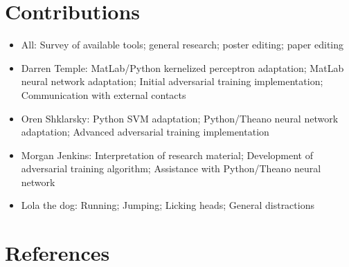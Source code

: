 \documentclass{article} %
\begin{document}

\section*{Contributions}
\label{sec:contributions}

\begin{itemize}
\item All: Survey of available tools; general research; poster editing; paper editing
\item Darren Temple: MatLab/Python kernelized perceptron adaptation; MatLab neural network adaptation; Initial adversarial training implementation; Communication with external contacts
\item Oren Shklarsky: Python SVM adaptation; Python/Theano neural network adaptation; Advanced adversarial training implementation
\item Morgan Jenkins: Interpretation of research material; Development of adversarial training algorithm; Assistance with Python/Theano neural network
\item Lola the dog: Running; Jumping; Licking heads; General distractions
\end{itemize}


\section*{References}
\label{sec:references}



\end{document}
